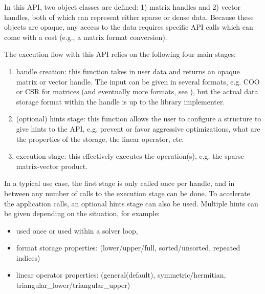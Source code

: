 \documentclass{article}
\begin{document}
In this API, two object classes are defined: 1) matrix handles and 2) vector handles, both of which can represent either sparse or dense data. Because these objects are opaque, any access to the data requires specific API calls which can come with a cost (e.g., a matrix format conversion).

The execution flow with this API relies on the following four main stages:
\begin{enumerate}
    \item handle creation: this function takes in user data and returns an opaque matrix or vector handle. The input can be given in several formats, e.g. COO or CSR for matrices (and eventually more formats, see ), but the actual data storage format within the handle is up to the library implementer.
    \item (optional) hints stage: this function allows the user to configure a structure to give hints to the API, e.g. prevent or favor aggressive optimizations, what are the properties of the storage, the linear operator, etc.
    \item execution stage: this effectively executes the operation(s), e.g. the sparse matrix-vector product.
\end{enumerate}

In a typical use case, the first stage is only called once per handle, and in between any number of calls to the execution stage can be done. To accelerate the application calls, an optional hints stage can also be used. Multiple hints can be given depending on the situation, for example:
\begin{itemize}
\item used once or used within a solver loop,
\item format storage properties: (lower/upper/full, sorted/unsorted, repeated indices)
\item linear operator properties: (general(default), symmetric/hermitian, triangular\_lower/triangular\_upper)  
\end{itemize}

\end{document}
